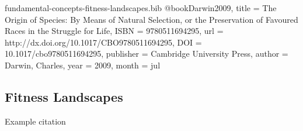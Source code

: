 \begin{bibunit}

\begin{filecontents*}[overwrite]{fundamental-concepts-fitness-landscapes.bib}
@book{Darwin2009,
  title = {The Origin of Species: By Means of Natural Selection,  or the Preservation of Favoured Races in the Struggle for Life},
  ISBN = {9780511694295},
  url = {http://dx.doi.org/10.1017/CBO9780511694295},
  DOI = {10.1017/cbo9780511694295},
  publisher = {Cambridge University Press},
  author = {Darwin,  Charles},
  year = {2009},
  month = jul 
}
\end{filecontents*} 

\subsection{Fitness Landscapes}
\label{sec:fitness-landscapes}

Example citation \citep{Darwin2009}

    
\end{bibunit}
